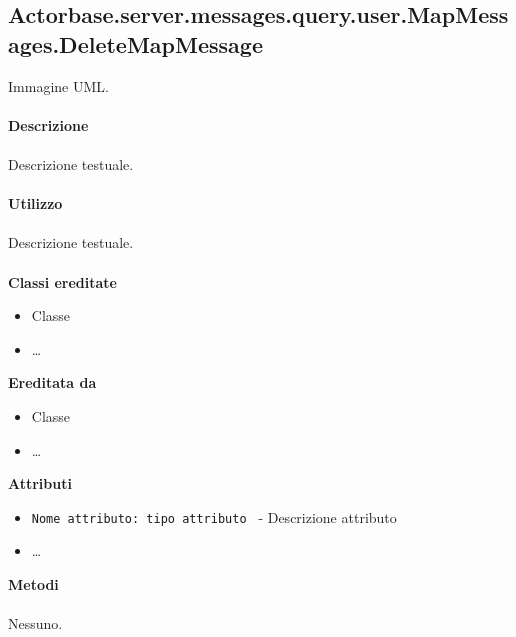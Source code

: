 \documentclass[a4paper]{article}
\begin{document}
	\subsection{Actorbase.server.messages.query.user.MapMessages.DeleteMapMessage}
		Immagine UML.
		\\ \\
		\textbf{Descrizione}
			\\ \\
			Descrizione testuale.
			\\ \\
		\textbf{Utilizzo}
			\\ \\
			Descrizione testuale.
			\\ \\
		\textbf{Classi ereditate}
			\begin{itemize}
				\item Classe
				\item \dots
			\end{itemize}
		\textbf{Ereditata da}
			\begin{itemize}
				\item Classe
				\item \dots
			\end{itemize}
		\textbf{Attributi}
			\begin{itemize}
				\item \texttt{Nome attributo: tipo attributo } - Descrizione attributo
				\item \dots
			\end{itemize}
		\textbf{Metodi}
			\\ \\
			Nessuno.
			
\end{document}
